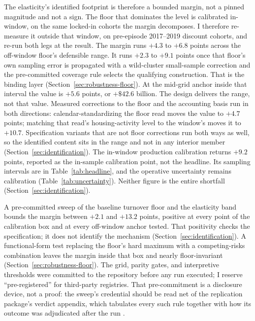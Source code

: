 \documentclass[12pt]{article}
\begin{document}
The elasticity's identified footprint is therefore a bounded margin, not a pinned magnitude and not a sign. The floor that dominates the level is calibrated in-window, on the same locked-in cohorts the margin decomposes. I therefore re-measure it outside that window, on pre-episode 2017--2019 discount cohorts, and re-run both legs at the result. The margin runs $+4.3$ to $+6.8$ points across the off-window floor's defensible range. It runs $+2.3$ to $+9.1$ points once that floor's own sampling error is propagated with a wild-cluster small-sample correction and the pre-committed coverage rule selects the qualifying construction. That is the binding layer (Section~\ref{sec:robustness-floor}). At the mid-grid anchor inside that interval the value is $+5.6$ points, or $+\$42.6$ billion. The design delivers the range, not that value. Measured corrections to the floor and the accounting basis run in both directions: calendar-standardizing the floor read moves the value to $+4.7$ points; matching that read's housing-activity level to the window's moves it to $+10.7$. Specification variants that are not floor corrections run both ways as well, so the identified content sits in the range and not in any interior member (Section~\ref{sec:identification}). The in-window production calibration returns $+9.2$ points, reported as the in-sample calibration point, not the headline. Its sampling intervals are in Table~\ref{tab:headline}, and the operative uncertainty remains calibration (Table~\ref{tab:uncertainty}). Neither figure is the entire shortfall (Section~\ref{sec:identification}).

A pre-committed sweep of the baseline turnover floor and the elasticity band bounds the margin between $+2.1$ and $+13.2$ points, positive at every point of the calibration box and at every off-window anchor tested. That positivity checks the specification; it does not identify the mechanism (Section~\ref{sec:identification}). A functional-form test replacing the floor's hard maximum with a competing-risks combination leaves the margin inside that box and nearly floor-invariant (Section~\ref{sec:robustness-floor}). The grid, parity gates, and interpretive thresholds were committed to the repository before any run executed; I reserve ``pre-registered'' for third-party registries. That pre-commitment is a disclosure device, not a proof: the sweep's credential should be read net of the replication package's verdict appendix, which tabulates every such rule together with how its outcome was adjudicated after the run \citep{olken2015}.
\end{document}
